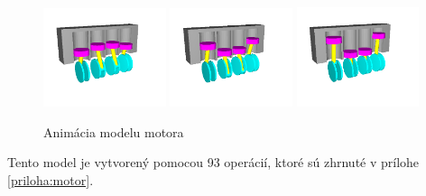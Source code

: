 \begin{figure}[H]
	\includegraphics[trim=40 40 80 40,clip,width=0.32\textwidth]{obrazky-figures/Examples/engine/engine t=7.png}
	\includegraphics[trim=40 40 80 40,clip,width=0.32\textwidth]{obrazky-figures/Examples/engine/engine t=8.png}
	\includegraphics[trim=40 40 80 40,clip,width=0.32\textwidth]{obrazky-figures/Examples/engine/engine t=9.png}
	\caption{Animácia modelu motora}
	\label{fig:motorAnimation}
\end{figure}
Tento model je vytvorený pomocou 93 operácií, ktoré sú zhrnuté v prílohe \ref{priloha:motor}.









